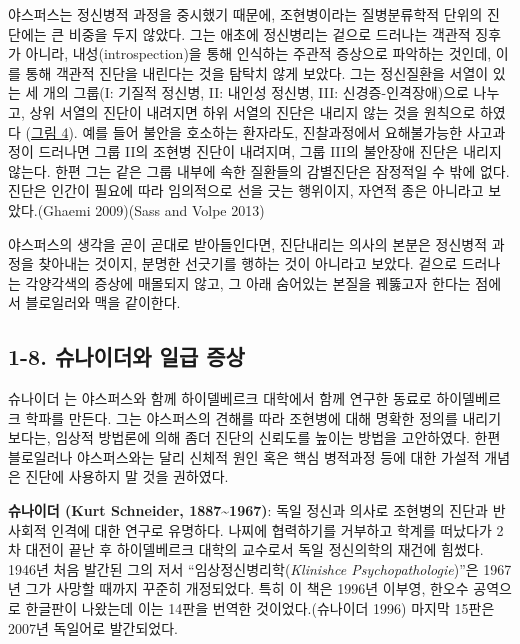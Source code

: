 \documentclass[
]{article}
\begin{document}
야스퍼스는 정신병적 과정을 중시했기 때문에, 조현병이라는 질병분류학적
단위의 진단에는 큰 비중을 두지 않았다. 그는 애초에 정신병리는 겉으로
드러나는 객관적 징후가 아니라, 내성(introspection)을 통해 인식하는
주관적 증상으로 파악하는 것인데, 이를 통해 객관적 진단을 내린다는 것을
탐탁치 않게 보았다. 그는 정신질환을 서열이 있는 세 개의 그룹(I: 기질적
정신병, II: 내인성 정신병, III: 신경증-인격장애)으로 나누고, 상위 서열의
진단이 내려지면 하위 서열의 진단은 내리지 않는 것을 원칙으로 하였다
(\protect\hyperlink{fig:hierarchy}{그림 4}). 예를 들어 불안을 호소하는
환자라도, 진찰과정에서 요해불가능한 사고과정이 드러나면 그룹 II의 조현병
진단이 내려지며, 그룹 III의 불안장애 진단은 내리지 않는다. 한편 그는
같은 그룹 내부에 속한 질환들의 감별진단은 잠정적일 수 밖에 없다. 진단은
인간이 필요에 따라 임의적으로 선을 긋는 행위이지, 자연적 종은 아니라고
보았다.(Ghaemi 2009)(Sass and Volpe 2013)

야스퍼스의 생각을 곧이 곧대로 받아들인다면, 진단내리는 의사의 본분은
정신병적 과정을 찾아내는 것이지, 분명한 선긋기를 행하는 것이 아니라고
보았다. 겉으로 드러나는 각양각색의 증상에 매몰되지 않고, 그 아래
숨어있는 본질을 꿰뚫고자 한다는 점에서 블로일러와 맥을 같이한다.

\hypertarget{section}{%
\subsubsection{}\label{section}}

\hypertarget{schneider-first-rank}{%
\subsection{1-8. 슈나이더와 일급 증상}\label{schneider-first-rank}}

슈나이더 는 야스퍼스와 함께 하이델베르크 대학에서 함께 연구한 동료로
하이델베르크 학파를 만든다. 그는 야스퍼스의 견해를 따라 조현병에 대해
명확한 정의를 내리기 보다는, 임상적 방법론에 의해 좀더 진단의 신뢰도를
높이는 방법을 고안하였다. 한편 블로일러나 야스퍼스와는 달리 신체적 원인
혹은 핵심 병적과정 등에 대한 가설적 개념은 진단에 사용하지 말 것을
권하였다.

\textbf{슈나이더 (Kurt Schneider, 1887\textasciitilde1967)}: 독일 정신과
의사로 조현병의 진단과 반사회적 인격에 대한 연구로 유명하다. 나찌에
협력하기를 거부하고 학계를 떠났다가 2차 대전이 끝난 후 하이델베르크
대학의 교수로서 독일 정신의학의 재건에 힘썼다. 1946년 처음 발간된 그의
저서 ``임상정신병리학(\emph{Klinishce Psychopathologie})''은 1967년 그가
사망할 때까지 꾸준히 개정되었다. 특히 이 책은 1996년 이부영, 한오수
공역으로 한글판이 나왔는데 이는 14판을 번역한 것이었다.(슈나이더 1996)
마지막 15판은 2007년 독일어로 발간되었다.
\end{document}
